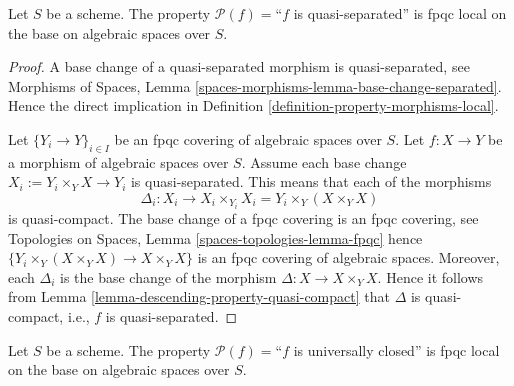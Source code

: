 \begin{lemma}
\label{lemma-descending-property-quasi-separated}
Let $S$ be a scheme.
The property $\mathcal{P}(f) =$``$f$ is quasi-separated''
is fpqc local on the base on algebraic spaces over $S$.
\end{lemma}

\begin{proof}
A base change of a quasi-separated morphism is quasi-separated, see
Morphisms of Spaces,
Lemma \ref{spaces-morphisms-lemma-base-change-separated}.
Hence the direct implication in
Definition \ref{definition-property-morphisms-local}.

\medskip\noindent
Let $\{Y_i \to Y\}_{i \in I}$ be an fpqc covering of algebraic spaces over $S$.
Let $f : X \to Y$ be a morphism of algebraic spaces over $S$.
Assume each base change $X_i := Y_i \times_Y X \to Y_i$ is quasi-separated.
This means that each of the morphisms
$$
\Delta_i :
X_i
\longrightarrow
X_i \times_{Y_i} X_i = Y_i \times_Y (X \times_Y X)
$$
is quasi-compact. The base change of a fpqc covering is an fpqc covering, see
Topologies on Spaces, Lemma \ref{spaces-topologies-lemma-fpqc}
hence $\{Y_i \times_Y (X \times_Y X) \to X \times_Y X\}$
is an fpqc covering of algebraic spaces. Moreover, each
$\Delta_i$ is the base change of the morphism
$\Delta : X \to X \times_Y X$. Hence it follows from
Lemma \ref{lemma-descending-property-quasi-compact}
that $\Delta$ is quasi-compact, i.e., $f$ is quasi-separated.
\end{proof}

\begin{lemma}
\label{lemma-descending-property-universally-closed}
Let $S$ be a scheme.
The property $\mathcal{P}(f) =$``$f$ is universally closed''
is fpqc local on the base on algebraic spaces over $S$.
\end{lemma}

